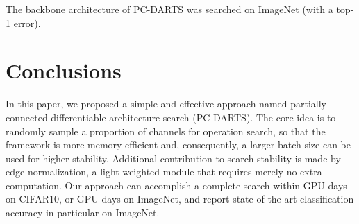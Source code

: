 \documentclass{article} \usepackage{iclr2020_conference,times}
\begin{document}
\begin{table}[!t]
\centering
\caption{Detection results, in terms of average precisions, on the MS-COCO dataset (test-dev 2015).}
\label{table:detection}
\begin{threeparttable}[b]
\begin{tablenotes}
\item[] {\footnotesize The backbone architecture of PC-DARTS was searched on ImageNet (with a  top-1 error).}
\end{tablenotes}\end{threeparttable}
\end{table}
\section{Conclusions}
\label{Conclusions}

In this paper, we proposed a simple and effective approach named partially-connected differentiable architecture search (PC-DARTS). The core idea is to randomly sample a proportion of channels for operation search, so that the framework is more memory efficient and, consequently, a larger batch size can be used for higher stability. Additional contribution to search stability is made by edge normalization, a light-weighted module that requires merely no extra computation. Our approach can accomplish a complete search within  GPU-days on CIFAR10, or  GPU-days on ImageNet, and report state-of-the-art classification accuracy in particular on ImageNet.
\end{document}
